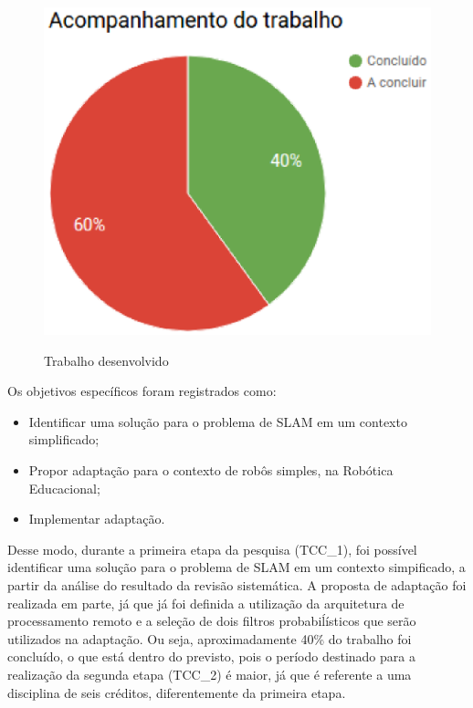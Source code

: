\begin{figure}[H]
	\centering
	\includegraphics[scale=0.6]{figuras/porcentagem.eps}
	\label{img:porcentagemFinal}
	\caption[Trabalho desenvolvido]{Trabalho desenvolvido}
\end{figure}

Os objetivos específicos foram registrados como:

\begin{itemize}
	\item Identificar uma solução para o problema de SLAM em um contexto simplificado;
	\item Propor adaptação para o contexto de robôs simples, na Robótica Educacional;
	\item Implementar adaptação.
\end{itemize}

Desse modo, durante a primeira etapa da pesquisa (TCC\_1), foi possível identificar uma solução para o problema de SLAM em um contexto simpificado, a partir da análise do resultado da revisão sistemática. A proposta de adaptação foi realizada em parte, já que já foi definida a utilização da arquitetura de processamento remoto e a seleção de dois filtros probabiĺísticos que serão utilizados na adaptação. Ou seja, aproximadamente 40\% do trabalho foi concluído, o que está dentro do previsto, pois o período destinado para a realização da segunda etapa (TCC\_2) é maior, já que é referente a uma disciplina de seis créditos, diferentemente da primeira etapa.